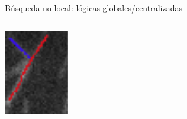 \begin{frame}{B\'usqueda no local: l\'ogicas globales/centralizadas}
\begin{columns}
\begin{column}{0.2\textwidth}
        \vspace{0.5cm}
        \includegraphics[scale=0.5]{Pictures/NoConsenso4.png}
        \end{column}
    \end{columns}
\end{frame}

